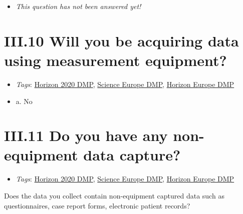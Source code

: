 \documentclass[a4paper,12pt]{report}
\begin{document}
\begin{itemize}
  \item[\XSolidBrush] \textit{This question has not been answered yet!}
\end{itemize}
  


\section*{\protect\textcolor{colorSecId}{III.10} Will you be acquiring data using measurement equipment?}

\label{b1df3c74-0b1f-4574-81c4-4cc2d780c1af.f87c331d-794a-42c8-a910-61a2a9110dab}


\begin{itemize}
  \item \textit{Tags}: \ul{Horizon 2020 DMP}, \ul{Science Europe DMP}, \ul{Horizon Europe DMP}
  \end{itemize}




\begin{itemize}
  \item[\CheckmarkBold] a. No
\end{itemize}






\section*{\protect\textcolor{colorSecId}{III.11} Do you have any non-equipment data capture?}

\label{b1df3c74-0b1f-4574-81c4-4cc2d780c1af.f038bd46-ee4e-4f53-b7ea-482381c2c855}


\begin{itemize}
  \item \textit{Tags}: \ul{Horizon 2020 DMP}, \ul{Science Europe DMP}, \ul{Horizon Europe DMP}
  \end{itemize}


\noindent
\begin{markdown}
Does the data you collect contain non-equipment captured data such as questionnaires, case report forms, electronic patient records?
\end{markdown}
\end{document}
